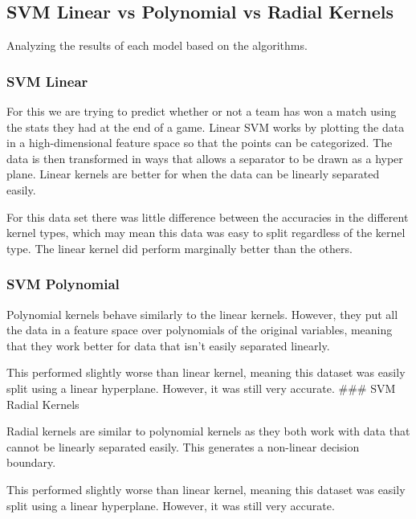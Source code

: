\documentclass[
]{article}
\newenvironment{Shaded}{\begin{snugshade}}{\end{snugshade}}
\newcommand{\AttributeTok}[1]{\textcolor[rgb]{0.77,0.63,0.00}{#1}}
\newcommand{\DecValTok}[1]{\textcolor[rgb]{0.00,0.00,0.81}{#1}}
\newcommand{\FunctionTok}[1]{\textcolor[rgb]{0.00,0.00,0.00}{#1}}
\newcommand{\NormalTok}[1]{#1}
\newcommand{\OtherTok}[1]{\textcolor[rgb]{0.56,0.35,0.01}{#1}}
\newcommand{\SpecialCharTok}[1]{\textcolor[rgb]{0.00,0.00,0.00}{#1}}
\begin{document}
\begin{Shaded}
\end{Shaded}

\hypertarget{svm-linear-vs-polynomial-vs-radial-kernels}{%
\subsection{SVM Linear vs Polynomial vs Radial
Kernels}\label{svm-linear-vs-polynomial-vs-radial-kernels}}

Analyzing the results of each model based on the algorithms.

\hypertarget{svm-linear}{%
\subsubsection{SVM Linear}\label{svm-linear}}

For this we are trying to predict whether or not a team has won a match
using the stats they had at the end of a game. Linear SVM works by
plotting the data in a high-dimensional feature space so that the points
can be categorized. The data is then transformed in ways that allows a
separator to be drawn as a hyper plane. Linear kernels are better for
when the data can be linearly separated easily.

For this data set there was little difference between the accuracies in
the different kernel types, which may mean this data was easy to split
regardless of the kernel type. The linear kernel did perform marginally
better than the others.

\hypertarget{svm-polynomial}{%
\subsubsection{SVM Polynomial}\label{svm-polynomial}}

Polynomial kernels behave similarly to the linear kernels. However, they
put all the data in a feature space over polynomials of the original
variables, meaning that they work better for data that isn't easily
separated linearly.

This performed slightly worse than linear kernel, meaning this dataset
was easily split using a linear hyperplane. However, it was still very
accurate. \#\#\# SVM Radial Kernels

Radial kernels are similar to polynomial kernels as they both work with
data that cannot be linearly separated easily. This generates a
non-linear decision boundary.

This performed slightly worse than linear kernel, meaning this dataset
was easily split using a linear hyperplane. However, it was still very
accurate.
\end{document}
